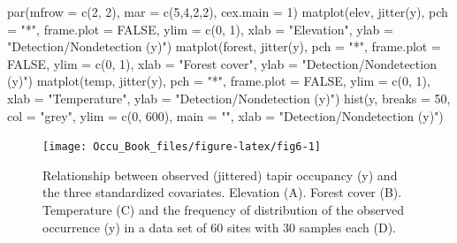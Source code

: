 \documentclass[
]{book}
\newenvironment{Shaded}{\begin{snugshade}}{\end{snugshade}}
\newcommand{\AttributeTok}[1]{\textcolor[rgb]{0.77,0.63,0.00}{#1}}
\newcommand{\ConstantTok}[1]{\textcolor[rgb]{0.00,0.00,0.00}{#1}}
\newcommand{\DecValTok}[1]{\textcolor[rgb]{0.00,0.00,0.81}{#1}}
\newcommand{\FunctionTok}[1]{\textcolor[rgb]{0.00,0.00,0.00}{#1}}
\newcommand{\NormalTok}[1]{#1}
\newcommand{\StringTok}[1]{\textcolor[rgb]{0.31,0.60,0.02}{#1}}
\begin{document}
\begin{Shaded}
\begin{Highlighting}[]
\FunctionTok{par}\NormalTok{(}\AttributeTok{mfrow =} \FunctionTok{c}\NormalTok{(}\DecValTok{2}\NormalTok{, }\DecValTok{2}\NormalTok{), }\AttributeTok{mar =} \FunctionTok{c}\NormalTok{(}\DecValTok{5}\NormalTok{,}\DecValTok{4}\NormalTok{,}\DecValTok{2}\NormalTok{,}\DecValTok{2}\NormalTok{), }\AttributeTok{cex.main =} \DecValTok{1}\NormalTok{)}
\FunctionTok{matplot}\NormalTok{(elev, }\FunctionTok{jitter}\NormalTok{(y), }\AttributeTok{pch =} \StringTok{"*"}\NormalTok{, }\AttributeTok{frame.plot =} \ConstantTok{FALSE}\NormalTok{, }\AttributeTok{ylim =} \FunctionTok{c}\NormalTok{(}\DecValTok{0}\NormalTok{, }\DecValTok{1}\NormalTok{), }
        \AttributeTok{xlab =} \StringTok{"Elevation"}\NormalTok{, }\AttributeTok{ylab =} \StringTok{"Detection/Nondetection (y)"}\NormalTok{)}
\FunctionTok{matplot}\NormalTok{(forest, }\FunctionTok{jitter}\NormalTok{(y), }\AttributeTok{pch =} \StringTok{"*"}\NormalTok{, }\AttributeTok{frame.plot =} \ConstantTok{FALSE}\NormalTok{, }\AttributeTok{ylim =} \FunctionTok{c}\NormalTok{(}\DecValTok{0}\NormalTok{, }\DecValTok{1}\NormalTok{), }
        \AttributeTok{xlab =} \StringTok{"Forest cover"}\NormalTok{, }\AttributeTok{ylab =} \StringTok{"Detection/Nondetection (y)"}\NormalTok{)}
\FunctionTok{matplot}\NormalTok{(temp, }\FunctionTok{jitter}\NormalTok{(y), }\AttributeTok{pch =} \StringTok{"*"}\NormalTok{, }\AttributeTok{frame.plot =} \ConstantTok{FALSE}\NormalTok{, }\AttributeTok{ylim =} \FunctionTok{c}\NormalTok{(}\DecValTok{0}\NormalTok{, }\DecValTok{1}\NormalTok{), }
        \AttributeTok{xlab =} \StringTok{"Temperature"}\NormalTok{, }\AttributeTok{ylab =} \StringTok{"Detection/Nondetection (y)"}\NormalTok{)}
\FunctionTok{hist}\NormalTok{(y, }\AttributeTok{breaks =} \DecValTok{50}\NormalTok{, }\AttributeTok{col =} \StringTok{"grey"}\NormalTok{, }\AttributeTok{ylim =} \FunctionTok{c}\NormalTok{(}\DecValTok{0}\NormalTok{, }\DecValTok{600}\NormalTok{), }\AttributeTok{main =} \StringTok{""}\NormalTok{, }
     \AttributeTok{xlab =} \StringTok{"Detection/Nondetection (y)"}\NormalTok{)}
\end{Highlighting}
\end{Shaded}

\begin{figure}
\texttt{[image: Occu\_Book\_files/figure-latex/fig6-1]} \caption[fig6]{Relationship between observed (jittered) tapir occupancy (y) and the three standardized covariates. Elevation (A). Forest cover (B). Temperature (C) and the frequency of distribution of the observed occurrence (y) in a data set of 60 sites with 30 samples each (D).}\label{fig:fig6}
\end{figure}
\end{document}
